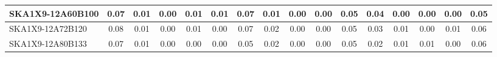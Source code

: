 \begin{table}[H]
{{\begin{tabular}{|lccccc||ccccc||ccccc|}
SKA1X9-12A60B100 & 0.07 \cellcolor{blue!18.00} & 0.01 \cellcolor{red!18.00} & 0.00 \cellcolor{green!18.00} & 0.01 \cellcolor{orange!60.00} & 0.01 \cellcolor{purple!39.00} & 0.07 \cellcolor{blue!46.00} & 0.01 \cellcolor{red!18.00} & 0.00 \cellcolor{green!18.00} & 0.00 \cellcolor{orange!18.00} & 0.05 \cellcolor{purple!60.00} & 0.04 \cellcolor{blue!39.00} & 0.00 \cellcolor{red!18.00} & 0.00 \cellcolor{green!18.00} & 0.00 \cellcolor{orange!18.00} & 0.05 \cellcolor{purple!18.00}\\ \hline 
SKA1X9-12A72B120 & 0.08 \cellcolor{blue!60.00} & 0.01 \cellcolor{red!18.00} & 0.00 \cellcolor{green!18.00} & 0.01 \cellcolor{orange!60.00} & 0.00 \cellcolor{purple!18.00} & 0.07 \cellcolor{blue!46.00} & 0.02 \cellcolor{red!60.00} & 0.00 \cellcolor{green!18.00} & 0.00 \cellcolor{orange!18.00} & 0.05 \cellcolor{purple!60.00} & 0.03 \cellcolor{blue!28.50} & 0.01 \cellcolor{red!60.00} & 0.00 \cellcolor{green!18.00} & 0.01 \cellcolor{orange!60.00} & 0.06 \cellcolor{purple!32.00}\\ \hline 
SKA1X9-12A80B133 & 0.07 \cellcolor{blue!18.00} & 0.01 \cellcolor{red!18.00} & 0.00 \cellcolor{green!18.00} & 0.00 \cellcolor{orange!18.00} & 0.00 \cellcolor{purple!18.00} & 0.05 \cellcolor{blue!18.00} & 0.02 \cellcolor{red!60.00} & 0.00 \cellcolor{green!18.00} & 0.00 \cellcolor{orange!18.00} & 0.05 \cellcolor{purple!60.00} & 0.02 \cellcolor{blue!18.00} & 0.01 \cellcolor{red!60.00} & 0.01 \cellcolor{green!60.00} & 0.00 \cellcolor{orange!18.00} & 0.06 \cellcolor{purple!32.00}\\ \hline 
\end{tabular}}
\vspace{-0.300000cm}
\hspace{1cm} 
}
\end{table}
